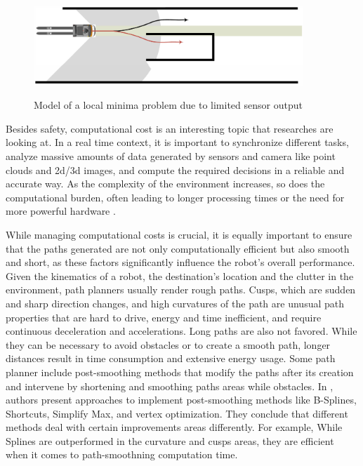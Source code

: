 \begin{figure}[H]
    \begin{center}
        \includegraphics[width=4in]{images/Chap1/local_minima.png}\\
        \caption{Model of a local minima problem 
        due to limited sensor output \cite{R28}}
        \label{local_minima}
        \end{center}
\end{figure}


Besides safety, computational cost is an interesting topic that researches 
are looking at. In a real time context, it is important to synchronize different tasks, 
analyze massive amounts of data generated by sensors and camera like point clouds and 2d/3d images, 
and compute the required decisions in a reliable and accurate way. As the complexity of the environment 
increases, so does the computational burden, often leading to longer processing times or the need for 
more powerful hardware \cite{R23}.

While managing computational costs is crucial, it is equally important to ensure that the paths 
generated are not only computationally efficient but also smooth and short, as these factors 
significantly influence the robot's overall performance.
Given the kinematics of a robot, the destination's location and the clutter in the environment, 
path planners usually render rough paths. Cusps, which are sudden and sharp direction changes, and high
curvatures of the path are unusual path properties that are hard to drive, energy and time inefficient, 
and require continuous deceleration and accelerations. Long paths are also not favored. While they can be 
necessary to avoid obstacles or to create a smooth path, longer distances result in time consumption and 
extensive energy usage. 
Some path planner include post-smoothing methods that modify the paths after its creation and intervene by
shortening and smoothing paths areas while obstacles. In \cite{R23}, authors present approaches 
to implement post-smoothing methods like B-Splines, Shortcuts, Simplify Max, and vertex optimization. 
They conclude that different methods deal with certain 
improvements areas differently. For example, While Splines are outperformed in the curvature and cusps 
areas, they are efficient when it comes to path-smoothning computation time.  

